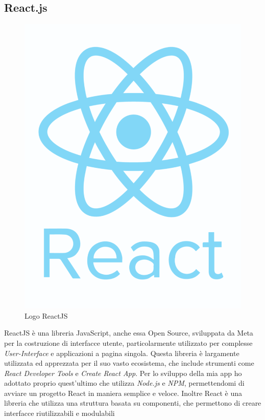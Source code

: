 \subsection{React.js}
\begin{figure}
    \centering
    \vspace{-15px}
    \includegraphics[scale=0.15]{img/react.png}
    \caption{Logo ReactJS}
\end{figure}
    
ReactJS è una libreria JavaScript, anche essa Open Source, sviluppata da Meta per la costruzione di interfacce utente, particolarmente utilizzato per complesse \textit{User-Interface} e applicazioni a pagina singola. Questa libreria è largamente utilizzata ed apprezzata per il suo vasto ecosistema, che include strumenti come \textit{React Developer Tools} e \textit{Create React App}. Per lo sviluppo della mia app ho adottato proprio quest'ultimo che utilizza \textit{Node.js} e \textit{NPM}, permettendomi di avviare un progetto React in maniera semplice e veloce. Inoltre React è una libreria che utilizza una struttura basata su componenti, che permettono di creare interfacce riutilizzabili e modulabili


